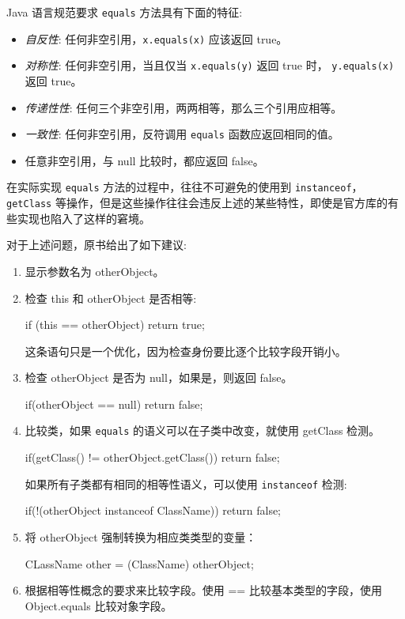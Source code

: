 Java 语言规范要求 \texttt{equals} 方法具有下面的特征:
\begin{itemize}
    \item \textit{自反性}: 任何非空引用，\texttt{x.equals(x)} 应该返回 true。
    \item \textit{对称性}: 任何非空引用，当且仅当 \texttt{x.equals(y)} 返回 true 时， \texttt{y.equals(x)} 返回 true。 
    \item \textit{传递性性}: 任何三个非空引用，两两相等，那么三个引用应相等。
    \item \textit{一致性}: 任何非空引用，反符调用 \texttt{equals} 函数应返回相同的值。
    \item 任意非空引用，与 null 比较时，都应返回 false。
\end{itemize}

在实际实现 \texttt{equals} 方法的过程中，往往不可避免的使用到 \texttt{instanceof}，\texttt{getClass} 等操作，但是这些操作往往会违反上述的某些特性，即使是官方库的有些实现也陷入了这样的窘境。

对于上述问题，原书给出了如下建议:
\begin{enumerate}
    \item 显示参数名为 otherObject。
    \item 检查 this 和 otherObject 是否相等:
\begin{Java}
if (this == otherObject) return true;
\end{Java}
    这条语句只是一个优化，因为检查身份要比逐个比较字段开销小。
    \item 检查 otherObject 是否为 null，如果是，则返回 false。
\begin{Java}
if(otherObject == null) return false;
\end{Java}
    \item 比较类，如果 \texttt{equals} 的语义可以在子类中改变，就使用 getClass 检测。
\begin{Java}
if(getClass() != otherObject.getClass()) return false;
\end{Java}

如果所有子类都有相同的相等性语义，可以使用 \texttt{instanceof} 检测:
\begin{Java}
if(!(otherObject instanceof ClassName)) return false;
\end{Java}

\item 将 otherObject 强制转换为相应类类型的变量：
\begin{Java}
CLassName other = (ClassName) otherObject;
\end{Java}

\item 根据相等性概念的要求来比较字段。使用 == 比较基本类型的字段，使用 Object.equals 比较对象字段。
\end{enumerate}

